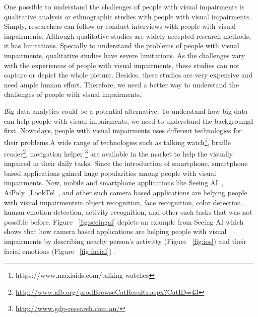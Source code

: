 \documentclass[sigconf]{acmart}
\begin{document}
One possible to understand the challenges of people with visual impairments is qualitative analysis or ethnographic studies with people with visual impairments. Simply, researchers can follow or conduct interviews with people with visual impairments. Although qualitative studies are widely accepted research methods, it has limitations. Specially to understand the problems of people with visual impairments, qualitative studies have severe limitations. As the challenges vary with the experiences of people with visual impairments, these studies can not capture or depict the whole picture. Besides, these studies are very expensive and need ample human effort. Therefore, we need a better way to understand the challenges of people with visual impairments.

Big data analytics could be a potential alternative. To understand how big data can help people with visual impairments, we need to understand the backgroungd first. Nowadays, people with visual impairments uses different technologies for their problems.A wide range of technologies such as talking watch\footnote{https://www.maxiaids.com/talking-watches}, braille reader\footnote{\url{http://www.afb.org/prodBrowseCatResults.aspx?CatID=43}}, navigation helper \footnote{\url{http://www.gdp-research.com.au/}} are available in the market to help the visually impaired in their daily tasks. Since the introduction of smartphone, smartphone based applications gained huge popularities among people with visual impairments. Now, mobile and smartphone applications like Seeing AI~\cite{seeingai}, AiPoly~\cite{aipoly},LookTel~\cite{looktel}, and other such camera based applications are helping people with visual impairmentsin object recognition, face recognition, color detection, human emotion detection, activity recognition, and other such tasks that was not possible before. Figure ~\ref{fig:seeingai} depicts an example from Seeing AI which shows that how camera based applications are helping people with visual impairments by describing nearby person's activitty (Figure ~\ref{fig:ios}) and their facial emotions (Figure ~\ref{fig:facial}) .
\end{document}
